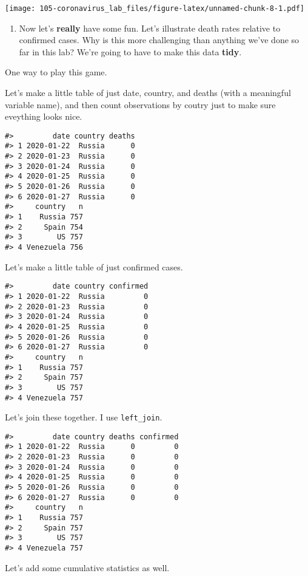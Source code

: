 \documentclass[
]{book}
\providecommand{\tightlist}{%
  \setlength{\itemsep}{0pt}\setlength{\parskip}{0pt}}
\begin{document}
\texttt{[image: 105-coronavirus\_lab\_files/figure-latex/unnamed-chunk-8-1.pdf]}

\begin{enumerate}
\def\labelenumi{\arabic{enumi}.}
\setcounter{enumi}{6}
\tightlist
\item
  Now let's \textbf{really} have some fun. Let's illustrate death rates relative to confirmed cases. Why is this more challenging than anything we've done so far in this lab? We're going to have to make this data \textbf{tidy}.
\end{enumerate}

One way to play this game.

Let's make a little table of just date, country, and deaths (with a meaningful variable name), and then count observations by coutry just to make sure eveything looks nice.

\begin{verbatim}
#>         date country deaths
#> 1 2020-01-22  Russia      0
#> 2 2020-01-23  Russia      0
#> 3 2020-01-24  Russia      0
#> 4 2020-01-25  Russia      0
#> 5 2020-01-26  Russia      0
#> 6 2020-01-27  Russia      0
#>     country   n
#> 1    Russia 757
#> 2     Spain 754
#> 3        US 757
#> 4 Venezuela 756
\end{verbatim}

Let's make a little table of just confirmed cases.

\begin{verbatim}
#>         date country confirmed
#> 1 2020-01-22  Russia         0
#> 2 2020-01-23  Russia         0
#> 3 2020-01-24  Russia         0
#> 4 2020-01-25  Russia         0
#> 5 2020-01-26  Russia         0
#> 6 2020-01-27  Russia         0
#>     country   n
#> 1    Russia 757
#> 2     Spain 757
#> 3        US 757
#> 4 Venezuela 757
\end{verbatim}

Let's join these together. I use \texttt{left\_join}.

\begin{verbatim}
#>         date country deaths confirmed
#> 1 2020-01-22  Russia      0         0
#> 2 2020-01-23  Russia      0         0
#> 3 2020-01-24  Russia      0         0
#> 4 2020-01-25  Russia      0         0
#> 5 2020-01-26  Russia      0         0
#> 6 2020-01-27  Russia      0         0
#>     country   n
#> 1    Russia 757
#> 2     Spain 757
#> 3        US 757
#> 4 Venezuela 757
\end{verbatim}

Let's add some cumulative statistics as well.
\end{document}
